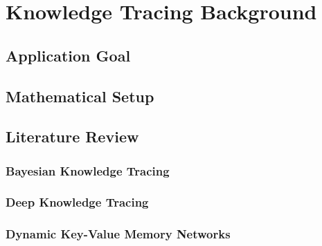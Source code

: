 \chapter{Knowledge Tracing Background}

\section{Application Goal}

\section{Mathematical Setup}

\section{Literature Review}

\subsection{Bayesian Knowledge Tracing}

\subsection{Deep Knowledge Tracing}

\subsection{Dynamic Key-Value Memory Networks}
